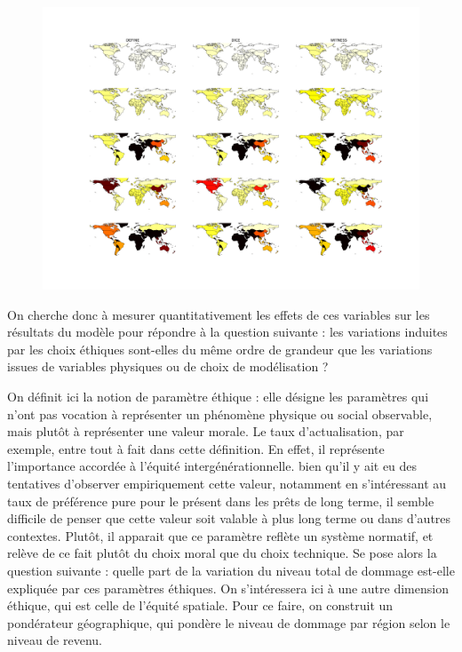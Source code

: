 \begin{figure}
    \centering
    \includegraphics[width=\linewidth]{results/carte_progressive.png}
    \label{fig:carte-progressive}
\end{figure}

On cherche donc à mesurer quantitativement les effets de ces variables sur les résultats du modèle pour répondre à la question suivante : les variations induites par les choix éthiques sont-elles du même ordre de grandeur que les variations issues de variables physiques ou de choix de modélisation ? 



On définit ici la notion de paramètre éthique : elle désigne les paramètres qui n'ont pas vocation à représenter un phénomène physique ou social observable, mais plutôt à représenter une valeur morale. Le taux d'actualisation, par exemple, entre tout à fait dans cette définition. En effet, il représente l'importance accordée à l'équité intergénérationnelle. bien qu'il y ait eu des tentatives d'observer empiriquement cette valeur, notamment en s'intéressant au taux de préférence pure pour le présent dans les prêts de long terme, il semble difficile de penser que cette valeur soit valable à plus long terme ou dans d'autres contextes. Plutôt, il apparait que ce paramètre reflète un système normatif, et relève de ce fait plutôt du choix moral que du choix technique. Se pose alors la question suivante : quelle part de la variation du niveau total de dommage est-elle expliquée par ces paramètres éthiques.  On s'intéressera ici à une autre dimension éthique, qui est celle de l'équité spatiale. Pour ce faire, on construit un pondérateur géographique, qui pondère le niveau de dommage par région selon le niveau de revenu.

